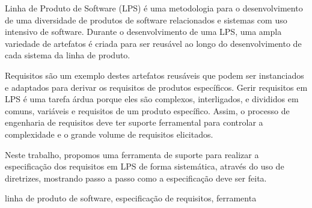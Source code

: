 Linha de Produto de Software (LPS) é uma metodologia para o desenvolvimento de uma diversidade 
de produtos de software relacionados e sistemas com uso intensivo de software. Durante o desenvolvimento de 
uma LPS, uma ampla variedade de artefatos é criada para ser reusável ao longo 
do desenvolvimento de cada sistema da linha de produto.

Requisitos são um exemplo destes artefatos reusáveis que podem ser instanciados e adaptados para derivar os 
requisitos de produtos específicos. Gerir requisitos em LPS é uma tarefa árdua porque eles são complexos, 
interligados, e divididos em comuns, variáveis e requisitos de um produto específico.  Assim, o processo de 
engenharia de requisitos deve ter suporte ferramental para controlar
a complexidade e o grande volume de requisitos elicitados.

Neste trabalho, propomos uma ferramenta de suporte para realizar a especificação dos requisitos em LPS de forma 
sistemática, através do uso de diretrizes, mostrando passo a passo como a especificação deve ser feita.

\begin{keywords}
linha de produto de software, especificação de requisitos, ferramenta
\end{keywords}